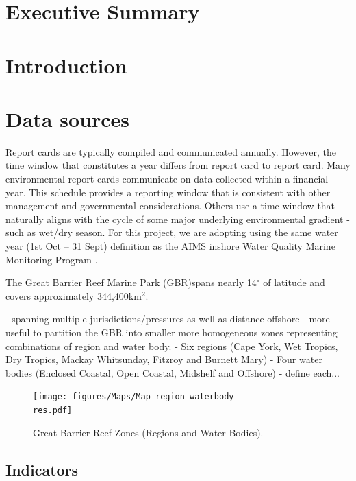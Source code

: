 \documentclass[a4paper]{AIMSreport}
\begin{document}
    
\newcommand{\res}{_small}

\section{Executive Summary}

\section{Introduction}

\section{Data sources}
 
Report cards are typically compiled and communicated annually.  However, the time window that
constitutes a year differs from report card to report card.  Many environmental report cards
communicate on data collected within a financial year.  This schedule provides a reporting window
that is consistent with other management and governmental considerations.  Others use a time window
that naturally aligns with the cycle of some major underlying environmental gradient - such as
wet/dry season. For this project, we are adopting using the same water year (1st Oct -- 31 Sept)
definition as the AIMS inshore Water Quality Marine Monitoring Program \citep{Lonborg-MMP-2015}.

The Great Barrier Reef Marine Park (GBR)spans nearly 14$^\circ$ of latitude and covers approximately
344,400km$^2$.

- spanning multiple jurisdictions/pressures as well as distance offshore - more useful to partition
the GBR into smaller more homogeneous zones representing combinations of region and water body.  -
Six regions (Cape York, Wet Tropics, Dry Tropics, Mackay Whitsunday, Fitzroy and Burnett Mary) -
Four water bodies (Enclosed Coastal, Open Coastal, Midshelf and Offshore) - define each...
 



\begin{figure}[ptbh] \texttt{[image: figures/Maps/Map\_region\_waterbody\\res.pdf]}
\caption{Great Barrier Reef Zones (Regions and Water Bodies).}\label{fig:Map_region_waterbody}
\end{figure}
   

 

\subsection{Indicators}
\end{document}
